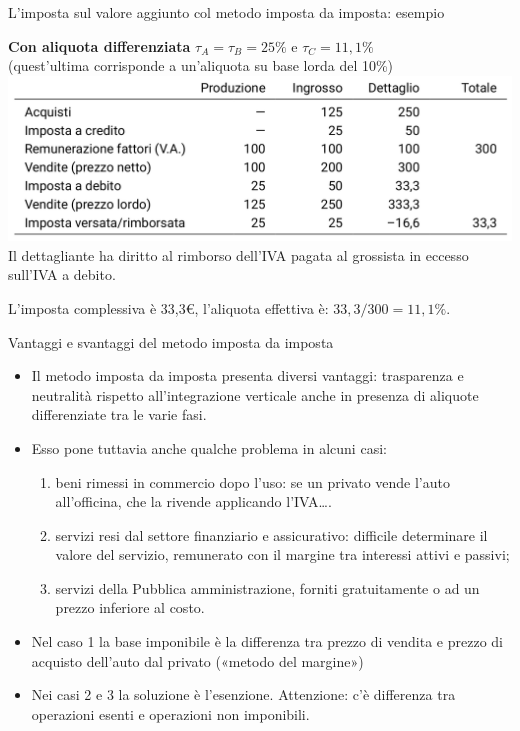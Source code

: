\documentclass[aspectratio=149,11pt,italian]{beamer}
\begin{document}
\begin{frame}{L'imposta sul valore aggiunto col metodo imposta da imposta: esempio}
\begin{block}{}
\item \textbf{Con aliquota differenziata} $\tau_A=\tau_B=25\%$ e $\tau_C=11,1\%$\\
(quest'ultima corrisponde a un'aliquota su base lorda del 10\%)\\
\includegraphics[width=\textwidth]{./figure/esempio-imposta-da-imposta-2.png}\\
Il dettagliante ha diritto al rimborso dell'IVA pagata al grossista in
eccesso sull'IVA a debito.

L'imposta complessiva è 33,3€, l'aliquota effettiva è: $33,3/300=11,1\%$.
\end{block}
\end{frame}

\begin{frame}{Vantaggi e svantaggi del metodo imposta da imposta}
\begin{itemize}
\item Il metodo imposta da imposta presenta diversi vantaggi: trasparenza e
neutralità rispetto all'integrazione verticale anche in presenza di aliquote
differenziate tra le varie fasi.
\item Esso pone tuttavia anche qualche problema in alcuni casi:
\begin{enumerate}
\item \alert{beni rimessi in commercio dopo l'uso}: se un privato vende l'auto
all'officina, che la rivende applicando l'IVA\ldots{}.
\item \alert{servizi resi dal settore finanziario e assicurativo}: difficile
determinare il valore del servizio, remunerato con il margine tra
interessi attivi e passivi;
\item \alert{servizi della Pubblica amministrazione}, forniti gratuitamente o ad un
prezzo inferiore al costo.
\end{enumerate}
\item Nel caso 1 la base imponibile è la differenza tra prezzo di vendita e prezzo
di acquisto dell'auto dal privato («metodo del margine»)
\item Nei casi 2 e 3 la soluzione è l'\alert{esenzione}. Attenzione: c'è differenza tra
operazioni esenti e operazioni non imponibili.
\end{itemize}
\end{frame}
\end{document}

